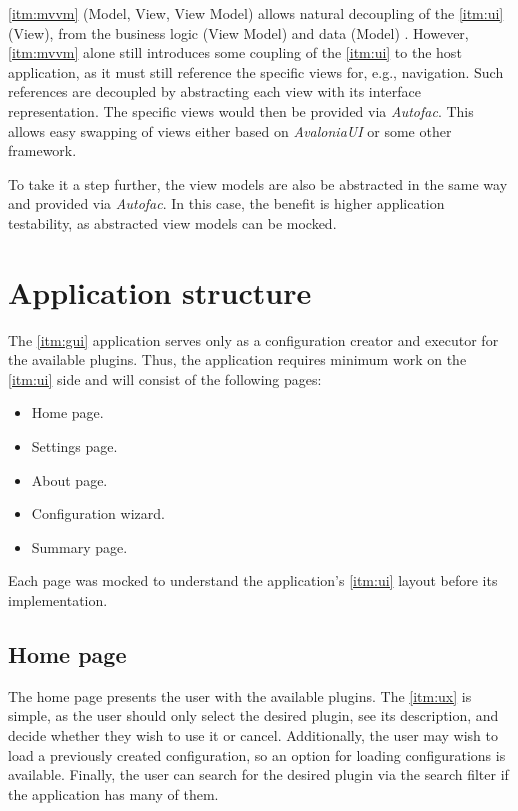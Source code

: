 \ref{itm:mvvm} (Model, View, View Model) allows natural decoupling of the \ref{itm:ui} (View), from the business logic (View Model) and data (Model) \cite{katz_mvvm_2022}. However, \ref{itm:mvvm} alone still introduces some coupling of the \ref{itm:ui} to the host application, as it must still reference the specific views for, e.g., navigation. Such references are decoupled by abstracting each view with its interface representation. The specific views would then be provided via \textit{Autofac}. This allows easy swapping of views either based on \textit{AvaloniaUI} or some other framework.

To take it a step further, the view models are also be abstracted in the same way and provided via \textit{Autofac}. In this case, the benefit is higher application testability, as abstracted view models can be mocked.

\section{Application structure}

The \ref{itm:gui} application serves only as a configuration creator and executor for the available plugins.
Thus, the application requires minimum work on the \ref{itm:ui} side and will consist of the following pages:
\begin{itemize}
    \item Home page.
    \item Settings page.
    \item About page.
    \item Configuration wizard.
    \item Summary page.
\end{itemize}

Each page was mocked to understand the application's \ref{itm:ui} layout before its implementation.

\subsection{Home page}

The home page presents the user with the available plugins. The \ref{itm:ux} is simple, as the user should only select the desired plugin, see its description, and decide whether they wish to use it or cancel.
Additionally, the user may wish to load a previously created configuration, so an option for loading configurations is available.
Finally, the user can search for the desired plugin via the search filter if the application has many of them.

